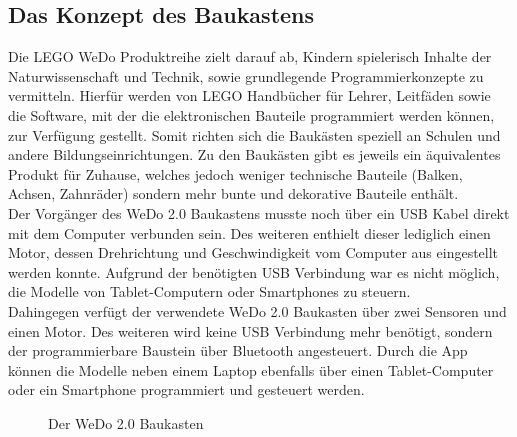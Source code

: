 \subsection{Das Konzept des Baukastens}
Die LEGO WeDo Produktreihe zielt darauf ab, Kindern spielerisch Inhalte der Naturwissenschaft und Technik, sowie grundlegende Programmierkonzepte zu vermitteln. Hierfür werden von LEGO Handbücher für Lehrer, Leitfäden sowie die Software, mit der die elektronischen Bauteile programmiert werden können, zur Verfügung gestellt. Somit richten sich die Baukästen speziell an Schulen und andere Bildungseinrichtungen. Zu den Baukästen gibt es jeweils ein äquivalentes Produkt für Zuhause, welches jedoch weniger technische Bauteile (Balken, Achsen, Zahnräder) sondern mehr bunte und dekorative Bauteile enthält.\\ 
Der Vorgänger des WeDo 2.0 Baukastens musste noch über ein USB Kabel direkt mit dem Computer verbunden sein. Des weiteren enthielt dieser lediglich einen Motor, dessen Drehrichtung und Geschwindigkeit vom Computer aus eingestellt werden konnte. Aufgrund der benötigten USB Verbindung war es nicht möglich, die Modelle von Tablet-Computern oder Smartphones zu steuern.  \\
Dahingegen verfügt der verwendete WeDo 2.0 Baukasten über zwei Sensoren und einen Motor. Des weiteren wird keine USB Verbindung mehr benötigt, sondern der programmierbare Baustein über Bluetooth angesteuert. Durch die App können die Modelle neben einem Laptop ebenfalls über einen Tablet-Computer oder ein Smartphone programmiert und gesteuert werden.

\begin{figure}[htbp!]
	\centering
	\caption[Der WeDo 2.0 Baukasten]{Der WeDo 2.0 Baukasten} %
	\label{img:lego-education-wedo-20}
\end{figure} 

